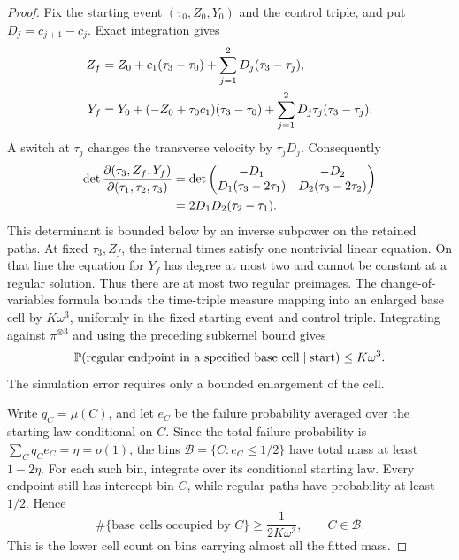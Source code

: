 \begin{proof}
Fix the starting event \((\tau_0,Z_0,Y_0)\) and the control
triple, and put \(D_j=c_{j+1}-c_j\).  Exact integration gives
\begin{align}
 Z_f&=Z_0+c_1(\tau_3-\tau_0)
        +\sum_{j=1}^2D_j(\tau_3-\tau_j),\notag\\
 Y_f&=Y_0+(-Z_0+\tau_0c_1)(\tau_3-\tau_0)
        +\sum_{j=1}^2D_j\tau_j(\tau_3-\tau_j).
 \label{a07:critical-endpoint}
\end{align}
A switch at \(\tau_j\) changes the transverse velocity by
\(\tau_jD_j\).  Consequently
\begin{align}
 \det\frac{\partial(\tau_3,Z_f,Y_f)}
              {\partial(\tau_1,\tau_2,\tau_3)}
 &=\det\begin{pmatrix}
 -D_1&-D_2\\
 D_1(\tau_3-2\tau_1)&D_2(\tau_3-2\tau_2)
 \end{pmatrix}\notag\\
 &=2D_1D_2(\tau_2-\tau_1).
 \label{a07:critical-jacobian}
\end{align}
This determinant is bounded below by an inverse subpower on the
retained paths.  At fixed \(\tau_3,Z_f\), the internal times
satisfy one nontrivial linear equation.  On that line the equation
for \(Y_f\) has degree at most two and cannot be constant at a
regular solution.  Thus there are at most two regular preimages.
The change-of-variables formula bounds the time-triple measure
mapping into an enlarged base cell by \(K\omega^3\), uniformly
in the fixed starting event and control triple.  Integrating against
\(\pi^{\otimes3}\) and using the preceding subkernel bound gives
\begin{equation}
 \mathbb P(\text{regular endpoint in a specified base cell}
             \mid\text{start})\le K\omega^3.
 \label{a07:critical-cell-cap}
\end{equation}
The simulation error requires only a bounded enlargement of the cell.

Write \(q_C=\widetilde\mu(C)\), and let \(e_C\) be the
failure probability averaged over the starting law conditional on
\(C\).  Since the total failure probability is
\(\sum_Cq_Ce_C=\eta=o(1)\), the bins
\(\mathcal B=\{C:e_C\le1/2\}\) have total mass at least
\(1-2\eta\).  For each such bin, integrate
 over its conditional starting law.
Every endpoint still has intercept bin \(C\), while regular
paths have probability at least \(1/2\).  Hence
\[
 \#\{\text{base cells occupied by }C\}
       \ge\frac1{2K\omega^3},\qquad C\in\mathcal B.
\]
This is the lower cell count on bins carrying almost all the fitted
mass.



\end{proof}
